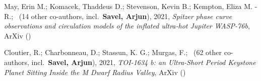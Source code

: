 \item[{\color{numcolor}\scriptsize2}] May, Erin M.; Komacek, Thaddeus D.; Stevenson, Kevin B.; Kempton, Eliza M. -R.; \etal\ ({14} other co-authors, incl.\ \textbf{Savel, Arjun}), 2021, \emph{Spitzer phase curve observations and circulation models of the inflated ultra-hot Jupiter WASP-76b}, ArXiv ()

\item[{\color{numcolor}\scriptsize1}] Cloutier, R.; Charbonneau, D.; Stassun, K. G.; Murgas, F.; \etal\ ({62} other co-authors, incl.\ \textbf{Savel, Arjun}), 2021, \emph{TOI-1634 b: an Ultra-Short Period Keystone Planet Sitting Inside the M Dwarf Radius Valley}, ArXiv ()